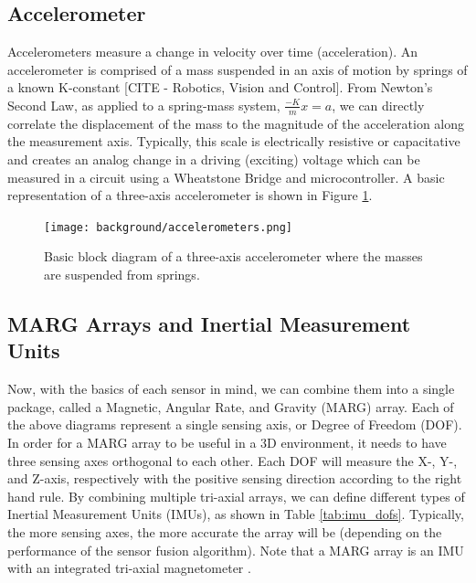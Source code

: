 \subsection{Accelerometer} \label{ssec:bkg_accelerometer}
Accelerometers measure a change in velocity over time (acceleration).
An accelerometer is comprised of a mass suspended in an axis of motion by springs of a known K-constant [CITE - Robotics, Vision and Control].
From Newton's Second Law, as applied to a spring-mass system, $\frac{-K}{m}x=a$, we can directly correlate the displacement of the mass to the magnitude of the acceleration along the measurement axis.
Typically, this scale is electrically resistive or capacitative and creates an analog change in a driving (exciting) voltage which can be measured in a circuit using a Wheatstone Bridge and microcontroller.
A basic representation of a three-axis accelerometer is shown in Figure \ref{fig:accelerometers}.

\begin{figure}[h!]
    \caption[Accelerometer block diagram]{Basic block diagram of a three-axis accelerometer where the masses are suspended from springs.}
    \label{fig:accelerometers}
    \centering
    \texttt{[image: background/accelerometers.png]}
\end{figure}

\subsection{MARG Arrays and Inertial Measurement Units}
Now, with the basics of each sensor in mind, we can combine them into a single package, called a Magnetic, Angular Rate, and Gravity (MARG) array.
Each of the above diagrams represent a single sensing axis, or Degree of Freedom (DOF).
In order for a MARG array to be useful in a 3D environment, it needs to have three sensing axes orthogonal to each other.
Each DOF will measure the X-, Y-, and Z-axis, respectively with the positive sensing direction according to the right hand rule.
By combining multiple tri-axial arrays, we can define different types of Inertial Measurement Units (IMUs), as shown in Table \ref{tab:imu_dofs}.
Typically, the more sensing axes, the more accurate the array will be (depending on the performance of the sensor fusion algorithm).
Note that a MARG array is an IMU with an integrated tri-axial magnetometer .

